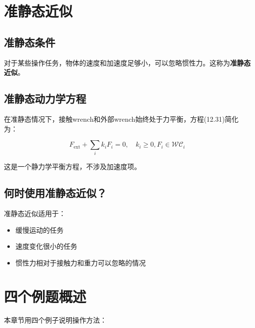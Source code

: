 \documentclass[12pt,a4paper]{article}
\begin{document}
\section{准静态近似}

\subsection{准静态条件}

对于某些操作任务，物体的速度和加速度足够小，可以忽略惯性力。这称为\textbf{准静态近似}。

\subsection{准静态动力学方程}

在准静态情况下，接触wrench和外部wrench始终处于力平衡，方程(12.31)简化为：

\begin{equation}
F_{\text{ext}} + \sum_i k_i F_i = 0, \quad k_i \geq 0, F_i \in \mathcal{WC}_i
\label{eq:12.32}
\end{equation}

这是一个静力学平衡方程，不涉及加速度项。

\subsection{何时使用准静态近似？}

准静态近似适用于：

\begin{itemize}
    \item 缓慢运动的任务
    \item 速度变化很小的任务
    \item 惯性力相对于接触力和重力可以忽略的情况
\end{itemize}

\section{四个例题概述}

本章节用四个例子说明操作方法：
\end{document}
